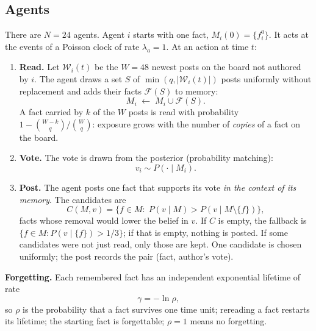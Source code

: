 \documentclass[10pt,a4paper]{article}
\newcommand{\Win}{\mathcal{W}}
\newcommand{\Fac}{\mathcal{F}}
\begin{document}
\subsection{Agents}
There are $N=24$ agents. Agent $i$ starts with one fact, $M_i(0)=\{f_i^0\}$. It acts at the events of a Poisson clock
of rate $\lambda_a=1$. At an action at time $t$:
\begin{enumerate}[label=(\roman*)]
\item \textbf{Read.} Let $\Win_i(t)$ be the $W=48$ newest posts on the board not authored by $i$. The agent draws a set
  $S$ of $\min(q,|\Win_i(t)|)$ posts uniformly without replacement and adds their facts $\Fac(S)$ to memory:
  \begin{equation}
    M_i\;\leftarrow\;M_i\cup\Fac(S).\label{eq:read}
  \end{equation}
  A fact carried by $k$ of the $W$ posts is read with probability $1-\binom{W-k}{q}\big/\binom{W}{q}$: exposure grows with
  the number of \emph{copies} of a fact on the board.
\item \textbf{Vote.} The vote is drawn from the posterior (probability matching):
  \begin{equation}
    v_i\sim P(\cdot\mid M_i).\label{eq:vote}
  \end{equation}
\item \textbf{Post.} The agent posts one fact that supports its vote \emph{in the context of its memory}. The candidates
  are
  \begin{equation}
    C(M,v)=\{f\in M:\;P(v\mid M)>P(v\mid M\setminus\{f\})\},\label{eq:candidates}
  \end{equation}
  facts whose removal would lower the belief in $v$. If $C$ is empty, the fallback is $\{f\in M: P(v\mid\{f\})>1/3\}$;
  if that is empty, nothing is posted. If some candidates were not just read, only those are kept. One candidate is
  chosen uniformly; the post records the pair (fact, author's vote).
\end{enumerate}
\textbf{Forgetting.} Each remembered fact has an independent exponential lifetime of rate
\begin{equation}
  \gamma=-\ln\rho,\label{eq:gamma}
\end{equation}
so $\rho$ is the probability that a fact survives one time unit; rereading a fact restarts its lifetime; the starting
fact is forgettable; $\rho=1$ means no forgetting.
\end{document}
